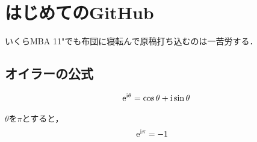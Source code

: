 \documentclass[b5j,fleqn]{jsarticle}
\begin{document}
\section{はじめてのGitHub}
いくらMBA 11"でも布団に寝転んで原稿打ち込むのは一苦労する．

\subsection{オイラーの公式}

\begin{align}
   \rm{e}^{\rm{i}\theta} &= \cos{\theta} + \rm{i}\sin{\theta}  \\
\end{align}

$\theta$を$\pi$とすると，
\begin{align}
   \rm{e}^{\rm{i}\pi} &= -1
\end{align}
\end{document}
